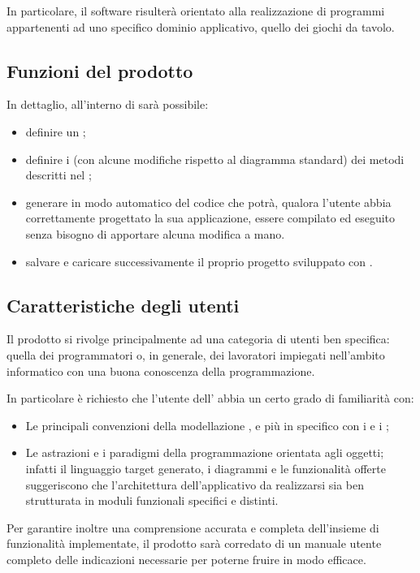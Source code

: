 	In particolare, il software risulterà orientato alla realizzazione di programmi appartenenti ad uno specifico dominio applicativo, quello dei giochi da tavolo.

	\subsection{Funzioni del prodotto}
	In dettaglio, all'interno di \proj{} sarà possibile:
	\begin{itemize}
	\item definire un ;
	\item definire i  (con alcune modifiche rispetto al diagramma standard) dei metodi descritti nel ;
	\item generare in modo automatico del codice che potrà, qualora l'utente abbia correttamente progettato la sua applicazione, essere compilato ed eseguito senza bisogno di apportare alcuna modifica a mano.
	\item salvare e caricare successivamente il proprio progetto sviluppato con \proj.
	\end{itemize}
	\subsection{Caratteristiche degli utenti}
	Il prodotto \proj{} si rivolge principalmente ad una categoria di utenti ben specifica: quella dei programmatori o, in generale, dei lavoratori impiegati nell'ambito informatico con una buona conoscenza della programmazione.

	In particolare è richiesto che l'utente dell' abbia un certo grado di familiarità con:
	\begin{itemize}
		\item Le principali convenzioni della modellazione , e più in specifico con i  e i ;
		\item Le astrazioni e i paradigmi della programmazione orientata agli oggetti; infatti il linguaggio target generato, i diagrammi e le funzionalità offerte suggeriscono che l'architettura dell'applicativo da realizzarsi sia ben strutturata in moduli funzionali specifici e distinti.
	\end{itemize}
	Per garantire inoltre una comprensione accurata e completa dell'insieme di funzionalità implementate, il prodotto sarà corredato di un manuale utente completo delle indicazioni necessarie per poterne fruire in modo efficace.

